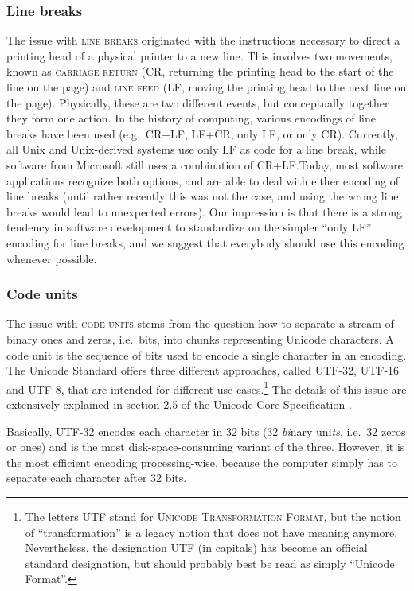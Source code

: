 \subsubsection*{Line breaks}

The issue with \textsc{line breaks} originated with the instructions necessary
to direct a printing head of a physical printer to a new line. This involves two
movements, known as \textsc{carriage return} (CR, returning the printing head to
the start of the line on the page) and \textsc{line feed} (LF, moving the
printing head to the next line on the page). Physically, these are two different
events, but conceptually together they form one action. In the history of
computing, various encodings of line breaks have been used (e.g.~CR+LF, LF+CR,
only LF, or only CR). Currently, all Unix and Unix-derived systems use only LF
as code for a line break, while software from Microsoft still uses a combination
of CR+LF.\@ Today, most software applications recognize both options, and
are able to deal with either encoding of line breaks (until rather recently this
was not the case, and using the wrong line breaks would lead to unexpected
errors). Our impression is that there is a strong tendency in software
development to standardize on the simpler ``only LF'' encoding for line
breaks, and we suggest that everybody should use this encoding whenever possible.

\subsubsection*{Code units}

The issue with \textsc{code units} stems from the question how to separate a
stream of binary ones and zeros, i.e.~bits, into chunks representing Unicode
characters. A code unit is the sequence of bits used to encode a single
character in an encoding. The Unicode Standard offers three different approaches, 
called UTF-32, UTF-16 and UTF-8, that are intended for different use cases.\footnote{The
letters UTF stand for \textsc{Unicode Transformation Format}, but the notion of
``transformation'' is a legacy notion that does not have meaning anymore.
Nevertheless, the designation UTF (in capitals) has become an official
standard designation, but should probably best be read as simply ``Unicode
Format''.} The details of this issue are extensively explained in section 2.5 of
the Unicode Core Specification \citep{Unicode2018}. 

Basically, \textsc{UTF-32} encodes each character in 32 bits (32 \textit{bi}nary
uni\textit{ts}, i.e.~32 zeros or ones) and is the most disk-space-consuming
variant of the three. However, it is the most efficient encoding
processing-wise, because the computer simply has to separate each character
after 32 bits. 

